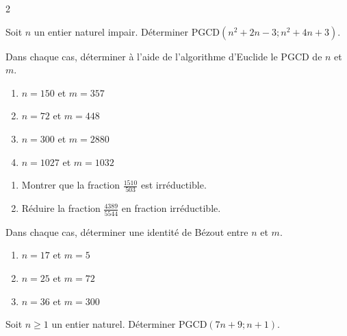 \documentclass[a4paper,12pt]{article}
\begin{document}
\begin{multicols}{2}
\begin{exercice}[title=Exercice 6 $\quad \star \star \star \quad$ { [Calculer, Chercher, Raisonner] }]{}{}
Soit $n$ un entier naturel impair. Déterminer $\text{PGCD}(n^2 + 2n - 3 ; n^2 + 4n + 3)$.
\end{exercice}

\begin{exercice}[title=Exercice 7 $\quad \star \quad$ { [Calculer] }]{}{}
Dans chaque cas, déterminer à l’aide de l’algorithme d’Euclide le PGCD de $n$ et $m$.
\begin{enumerate}
    \item $n = 150$ et $m = 357$
    \item $n = 72$ et $m = 448$
    \item $n = 300$ et $m = 2880$
    \item $n = 1027$ et $m = 1032$
\end{enumerate}
\end{exercice}

\begin{exercice}[title=Exercice 8 $\quad \star \quad$ { [Calculer] }]{}{}
    \begin{enumerate}
        \item Montrer que la fraction $\frac{1510}{503}$ est irréductible.
        \item Réduire la fraction $\frac{4389}{5544}$ en fraction irréductible.
    \end{enumerate}
    \end{exercice}
    
    \begin{exercice}[title=Exercice 9 $\quad \star \quad$ { [Calculer] }]{}{}
    Dans chaque cas, déterminer une identité de Bézout entre $n$ et $m$.
    \begin{enumerate}
        \item $n = 17$ et $m = 5$
        \item $n = 25$ et $m = 72$
        \item $n = 36$ et $m = 300$
    \end{enumerate}
    \end{exercice}
    
    \begin{exercice}[title=Exercice 10 $\quad \star \star \quad$ { [Calculer, Raisonner, Chercher] }]{}{}
    Soit $n \geq 1$ un entier naturel. Déterminer $\text{PGCD}(7n + 9 ; n + 1)$.
    \end{exercice}
    

\end{multicols}
\end{document}
